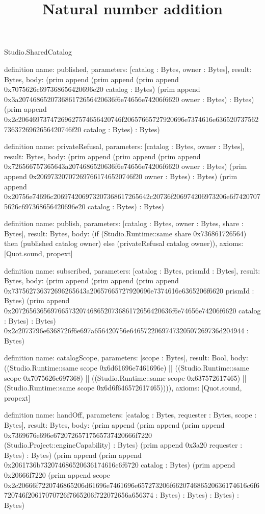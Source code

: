 \begin{lexlean}{Studio.SharedCatalog}
\title{Natural number addition}
\begin{semanticmodule}
definition{
  name: published,
  parameters: [catalog : Bytes, owner : Bytes],
  result: Bytes,
  body: (prim append (prim append (prim append 0x7075626c697368656420696e20 catalog : Bytes) (prim append 0x3a207468652073686172656420636f6e74656e74206f6620 owner : Bytes) : Bytes) (prim append 0x2c20646973747269627574656420746f20657665727920696e7374616e6365207375627363726962656420746f20 catalog : Bytes) : Bytes)
}

definition{
  name: privateRefusal,
  parameters: [catalog : Bytes, owner : Bytes],
  result: Bytes,
  body: (prim append (prim append (prim append 0x726566757365643a2074686520636f6e74656e74206f6620 owner : Bytes) (prim append 0x206973207072697661746520746f20 owner : Bytes) : Bytes) (prim append 0x20756e74696c206974206973207368617265642c20736f206974206973206e6f74207075626c697368656420696e20 catalog : Bytes) : Bytes)
}

definition{
  name: publish,
  parameters: [catalog : Bytes, owner : Bytes, share : Bytes],
  result: Bytes,
  body: (if (Studio.Runtime::same share 0x736861726564) then (published catalog owner) else (privateRefusal catalog owner)),
  axioms: [Quot.sound, propext]
}

definition{
  name: subscribed,
  parameters: [catalog : Bytes, prismId : Bytes],
  result: Bytes,
  body: (prim append (prim append (prim append 0x737562736372696265643a20657665727920696e7374616e6365206f6620 prismId : Bytes) (prim append 0x207265636569766573207468652073686172656420636f6e74656e74206f6620 catalog : Bytes) : Bytes) 0x2c2073796e6368726f6e697a656420756e6465722069747320507269736d204944 : Bytes)
}

definition{
  name: catalogScope,
  parameters: [scope : Bytes],
  result: Bool,
  body: ((Studio.Runtime::same scope 0x6d61696e7461696e) || ((Studio.Runtime::same scope 0x7075626c697368) || ((Studio.Runtime::same scope 0x637572617465) || (Studio.Runtime::same scope 0x6d6f646572617465)))),
  axioms: [Quot.sound, propext]
}

definition{
  name: handOff,
  parameters: [catalog : Bytes, requester : Bytes, scope : Bytes],
  result: Bytes,
  body: (prim append (prim append (prim append 0x7369676e696e67207265717565737420666f7220 (Studio.Project::engineCapability) : Bytes) (prim append 0x3a20 requester : Bytes) : Bytes) (prim append (prim append 0x2061736b732074686520636174616c6f6720 catalog : Bytes) (prim append 0x20666f7220 (prim append scope 0x2c20666f7220746865206d61696e7461696e657273206f662074686520636174616c6f6720746f20617070726f7665206f722072656a656374 : Bytes) : Bytes) : Bytes) : Bytes)
}


\end{semanticmodule}
\end{lexlean}
